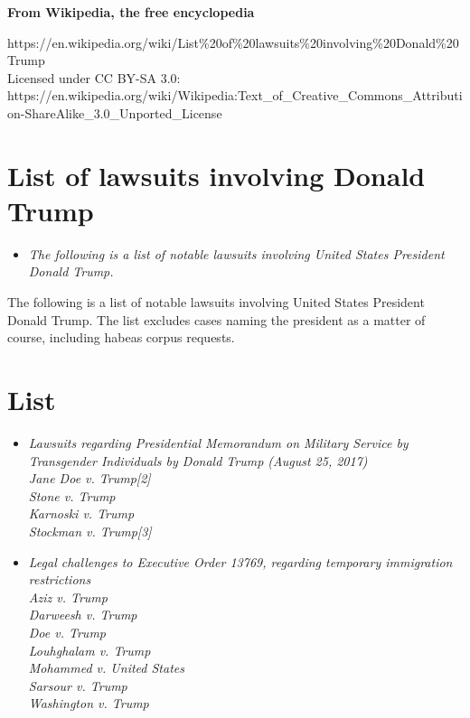 \textbf{From Wikipedia, the free encyclopedia}

https://en.wikipedia.org/wiki/List\%20of\%20lawsuits\%20involving\%20Donald\%20Trump\\
Licensed under CC BY-SA 3.0:\\
https://en.wikipedia.org/wiki/Wikipedia:Text\_of\_Creative\_Commons\_Attribution-ShareAlike\_3.0\_Unported\_License

\section{List of lawsuits involving Donald
Trump}\label{list-of-lawsuits-involving-donald-trump}

\begin{itemize}
\item
  \emph{The following is a list of notable lawsuits involving United
  States President Donald Trump.}
\end{itemize}

The following is a list of notable lawsuits involving United States
President Donald Trump. The list excludes cases naming the president as
a matter of course, including habeas corpus requests.

\section{List}\label{list}

\begin{itemize}
\item
  \emph{Lawsuits regarding Presidential Memorandum on Military Service
  by Transgender Individuals by Donald Trump (August 25, 2017)\\
  Jane Doe v. Trump{[}2{]}\\
  Stone v. Trump\\
  Karnoski v. Trump\\
  Stockman v. Trump{[}3{]}}
\item
  \emph{Legal challenges to Executive Order 13769, regarding temporary
  immigration restrictions\\
  Aziz v. Trump\\
  Darweesh v. Trump\\
  Doe v. Trump\\
  Louhghalam v. Trump\\
  Mohammed v. United States\\
  Sarsour v. Trump\\
  Washington v. Trump}
\end{itemize}

